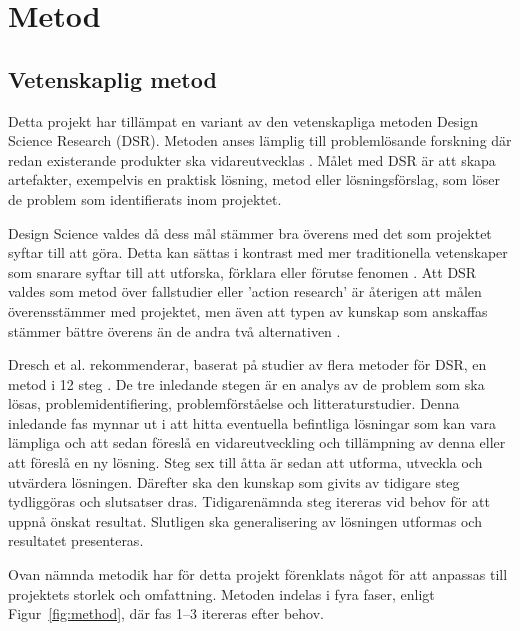\section{Metod} %
\label{sec:metod}
    
    \subsection{Vetenskaplig metod} %
    \label{sub:vetenskaplig_metod}
    	Detta projekt har tillämpat en variant av den vetenskapliga metoden Design Science Research (DSR). Metoden anses lämplig till problemlösande forskning där redan existerande produkter ska vidareutvecklas \cite{dsr}. Målet med DSR är att skapa artefakter, exempelvis en praktisk lösning, metod eller lösningsförslag, som löser de problem som identifierats inom projektet. \bigskip

        Design Science valdes då dess mål stämmer bra överens med det som projektet syftar till att göra. Detta kan sättas i kontrast med mer traditionella vetenskaper som snarare syftar till att utforska, förklara eller förutse fenomen \cite[s.~13]{dsr}. Att DSR valdes som metod över fallstudier eller 'action research' är återigen att målen överensstämmer med projektet, men även att typen av kunskap som anskaffas stämmer bättre överens än de andra två alternativen \cite[s.~95]{dsr}.\bigskip

    	Dresch et al. rekommenderar, baserat på studier av flera metoder för DSR, en metod i 12 steg \cite[s.~118--126]{dsr}. De tre inledande stegen är en analys av de problem som ska lösas, problemidentifiering, problemförståelse och litteraturstudier. Denna inledande fas mynnar ut i att hitta eventuella befintliga lösningar som kan vara lämpliga och att sedan föreslå en vidareutveckling och tillämpning av denna eller att föreslå en ny lösning. Steg sex till åtta är sedan att utforma, utveckla och utvärdera lösningen. Därefter ska den kunskap som givits av tidigare steg tydliggöras och slutsatser dras. Tidigarenämnda steg itereras vid behov för att uppnå önskat resultat. Slutligen ska generalisering av lösningen utformas och resultatet presenteras. \bigskip

    	Ovan nämnda metodik har för detta projekt förenklats något för att anpassas till projektets storlek och omfattning. Metoden indelas i fyra faser, enligt Figur~\ref{fig:method}, där fas 1--3 itereras efter behov.

